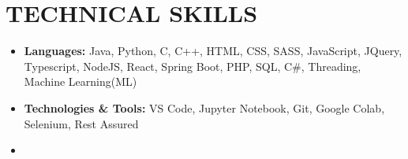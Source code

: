 \section{TECHNICAL SKILLS} {
    \begin{itemize}[leftmargin=0.15in, label={}]
        \item{\textbf{\normalsize{Languages:}}{ \normalsize{Java, Python, C, C++, HTML, CSS, SASS, JavaScript, JQuery, Typescript, NodeJS, React, Spring Boot, PHP, SQL, C\#, Threading, Machine Learning(ML)}}}
        \vspace{-0.3cm}
        \item{\textbf{\normalsize{Technologies \& Tools:}}{ \normalsize{VS Code, Jupyter Notebook, Git, Google Colab, Selenium, Rest Assured}}}
        \item
    \end{itemize}
}